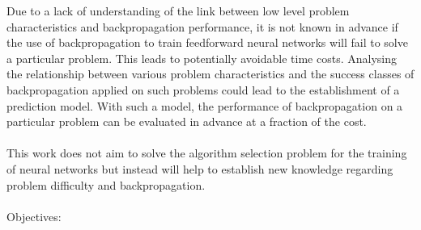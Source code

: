 \documentclass[runningheads,a4paper]{llncs}
\begin{document}
Due to a lack of understanding of the link between low level problem characteristics and backpropagation performance, 
it is not known in advance if the use of backpropagation to train feedforward neural networks will fail to solve a particular problem. 
This leads to potentially avoidable time costs.
Analysing the relationship between various problem characteristics and the success classes of backpropagation applied on such problems 
could lead to the establishment of a prediction model. With such a model, the performance of backpropagation on a particular problem can be 
evaluated in advance at a fraction of the cost.
\\\\
This work does not aim to solve the algorithm selection problem for the training of neural networks but instead will help to establish new knowledge 
regarding problem difficulty and backpropagation.
\\\\
Objectives:
\end{document}
